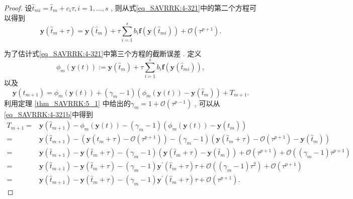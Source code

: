 \begin{proof}
设$\hat{t}_{m i}=\hat{t}_m+c_i\tau , i=1 , \ldots , s$ , 
则从式\eqref{eq_SAVRRK:4-321}中的第二个方程可以得到
\begin{equation}\label{eq_SAVRRK:4-321b}
\bm{y}\left(\hat{t}_m+\tau\right)=\bm{y}\left(\hat{t}_m\right)+\tau \sum_{i=1}^s b_i \bm{f}\left(\bm{y}\left(\hat{t}_{m i}\right)\right)+\mathcal{O}\left(\tau^{p+1}\right) . 
\end{equation}

为了估计式\eqref{eq_SAVRRK:4-321}中第三个方程的截断误差 . 
定义
$$\phi_m(\bm{y}(t)):=\bm{y}\left(\hat{t}_m\right)+\tau \sum\limits_{i=1}^s b_i \bm{f}\left(\bm{y}\left(\hat{t}_{m i}\right)\right) , $$
以及
\begin{equation}
\bm{y}\left(\hat{t}_{m+1}\right)=\phi_m(\bm{y}(t))+\left(\gamma_m-1\right)\left(\phi_m(\bm{y}(t))-\bm{y}\left(\hat{t}_m\right)\right)+T_{m+1} . 
\end{equation}
利用定理 \ref{thm_SAVRRK:5_1} 中给出的$\gamma_m=1+\mathcal{O}\left(\tau^{p-1}\right)$ , 可以从\eqref{eq_SAVRRK:4-321b}中得到
\begin{equation}
\begin{aligned}
T_{m+1}= & \bm{y}\left(\hat{t}_{m+1}\right)\!-\!\phi_m(\bm{y}(t))\!-\!\left(\gamma_m-1\right)\left(\phi_m(\bm{y}(t))\!-\!\bm{y}\left(\hat{t}_m\right)\right) \\
= & \bm{y}\left(\hat{t}_{m+1}\right)\!-\!\left(\bm{y}\left(\hat{t}_m\!+\!\tau\right)\!-\!\mathcal{O}(\tau^{p+1})\right)\!-\!\left(\gamma_m-1\right)\left(\bm{y}\left(\hat{t}_m+\tau\right)\!-\!\mathcal{O}(\tau^{p+1})\!-\!\bm{y}\left(\hat{t}_m\right)\right) \\
= & \bm{y}\left(\hat{t}_{m+1}\right)\!-\!\bm{y}\left(\hat{t}_m\!+\!\tau\right)\!-\!\left(\gamma_m-1\right)\left(\bm{y}\left(\hat{t}_m+\tau\right)\!-\!\bm{y}\left(\hat{t}_m\right)\right)\!+\!\mathcal{O}(\tau^{p+1})\!+\!\mathcal{O}((\gamma_m-1) \tau^{p+1}) \\
= & \bm{y}\left(\hat{t}_{m+1}\right)\!-\!\bm{y}\left(\hat{t}_m\!+\!\tau\right)\!-\!\left(\gamma_m-1\right) \bm{y}^{\prime}\left(\hat{t}_m+\tau\right) \tau\!+\!\mathcal{O}((\gamma_m-1) \tau^2)\!+\!\mathcal{O}(\tau^{p+1}) \\
= & \bm{y}\left(\hat{t}_{m+1}\right)\!-\!\bm{y}\left(\hat{t}_m\!+\!\tau\right)\!-\!\left(\gamma_m-1\right) \bm{y}^{\prime}\left(\hat{t}_m+\tau\right) \tau\!+\!\mathcal{O}(\tau^{p+1}) . 
\end{aligned}
\end{equation}


\end{proof}
